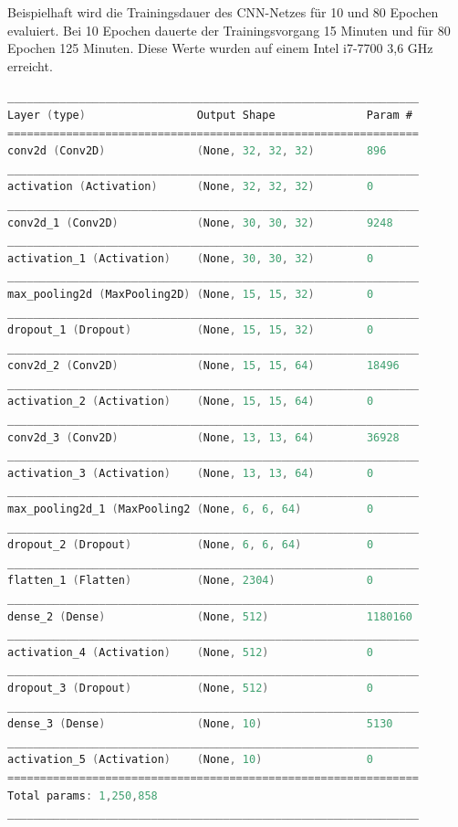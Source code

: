 Beispielhaft wird die Trainingsdauer des CNN-Netzes für 10 und 80 Epochen evaluiert. Bei 10 Epochen dauerte der Trainingsvorgang 15 Minuten und für 80 Epochen 125 Minuten. Diese Werte wurden auf einem Intel i7-7700 3,6 GHz erreicht. 

{\small
\begin{lstlisting}[language=C,caption=Exakte Modell-Architektur des Convolutional Neural Network ,label=auflistung_cnn]
_______________________________________________________________
Layer (type)                 Output Shape              Param #
===============================================================
conv2d (Conv2D)              (None, 32, 32, 32)        896
_______________________________________________________________
activation (Activation)      (None, 32, 32, 32)        0
_______________________________________________________________
conv2d_1 (Conv2D)            (None, 30, 30, 32)        9248
_______________________________________________________________
activation_1 (Activation)    (None, 30, 30, 32)        0
_______________________________________________________________
max_pooling2d (MaxPooling2D) (None, 15, 15, 32)        0
_______________________________________________________________
dropout_1 (Dropout)          (None, 15, 15, 32)        0
_______________________________________________________________
conv2d_2 (Conv2D)            (None, 15, 15, 64)        18496
_______________________________________________________________
activation_2 (Activation)    (None, 15, 15, 64)        0
_______________________________________________________________
conv2d_3 (Conv2D)            (None, 13, 13, 64)        36928
_______________________________________________________________
activation_3 (Activation)    (None, 13, 13, 64)        0
_______________________________________________________________
max_pooling2d_1 (MaxPooling2 (None, 6, 6, 64)          0
_______________________________________________________________
dropout_2 (Dropout)          (None, 6, 6, 64)          0
_______________________________________________________________
flatten_1 (Flatten)          (None, 2304)              0
_______________________________________________________________
dense_2 (Dense)              (None, 512)               1180160
_______________________________________________________________
activation_4 (Activation)    (None, 512)               0
_______________________________________________________________
dropout_3 (Dropout)          (None, 512)               0
_______________________________________________________________
dense_3 (Dense)              (None, 10)                5130
_______________________________________________________________
activation_5 (Activation)    (None, 10)                0
===============================================================
Total params: 1,250,858
_______________________________________________________________
\end{lstlisting}
}

